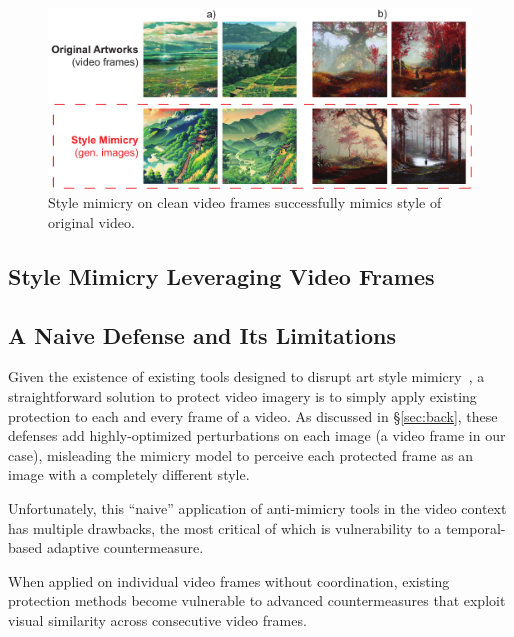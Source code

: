 \begin{figure}[t]
    \centering
    \includegraphics[width=1\columnwidth]{plots/clean-style-mimicry-eps-converted-to.pdf}
    \vspace{-0.2in}
    \caption{Style mimicry on clean video frames successfully mimics style of original video.}
    \label{fig:style-mimicry-baseline}
  \end{figure}
\subsection{Style Mimicry Leveraging Video Frames}

\subsection{A Naive Defense and Its Limitations}
\label{subsec:limitations}

Given the existence of existing tools designed to disrupt art style
mimicry~\cite{shan2023glaze,mist,antidb}, a straightforward solution to
protect video imagery is to simply apply existing protection to each and
every frame of a video.  As discussed in \S\ref{sec:back}, these defenses add
highly-optimized perturbations on each image (a video frame in our case),
misleading the mimicry model to perceive each protected frame as an image with a
completely different style.

Unfortunately, this ``naive'' application of anti-mimicry tools in the video
context has multiple drawbacks, the most critical of which is vulnerability
to a temporal-based adaptive countermeasure.

  When
applied on individual video frames without coordination, existing protection
methods become vulnerable to advanced countermeasures that exploit
visual similarity across consecutive video frames.

